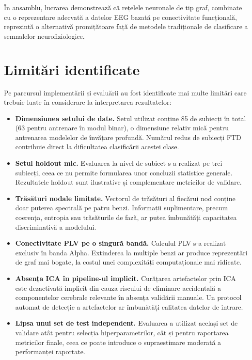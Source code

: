 \documentclass[12pt,a4paper]{report}
\theoremstyle{definition}
\theoremstyle{remark}
\begin{document}
În ansamblu, lucrarea demonstrează că rețelele neuronale de tip graf, combinate
cu o reprezentare adecvată a datelor EEG bazată pe conectivitate funcțională,
reprezintă o alternativă promițătoare față de metodele tradiționale de clasificare
a semnalelor neurofiziologice.

\section{Limitări identificate}

Pe parcursul implementării și evaluării au fost identificate mai multe limitări
care trebuie luate în considerare la interpretarea rezultatelor:

\begin{itemize}
    \item \textbf{Dimensiunea setului de date.} Setul utilizat conține 85 de
    subiecți în total (63 pentru antrenare în modul binar), o dimensiune relativ
    mică pentru antrenarea modelelor de învățare profundă. Numărul redus de
    subiecți FTD contribuie direct la dificultatea clasificării acestei clase.

    \item \textbf{Setul holdout mic.} Evaluarea la nivel de subiect s-a realizat
    pe trei subiecți, ceea ce nu permite formularea unor concluzii statistice
    generale. Rezultatele holdout sunt ilustrative și complementare metricilor
    de validare.

    \item \textbf{Trăsături nodale limitate.} Vectorul de trăsături al fiecărui
    nod conține doar puterea spectrală pe patru benzi. Informații suplimentare,
    precum coerența, entropia sau trăsăturile de fază, ar putea îmbunătăți
    capacitatea discriminativă a modelului.

    \item \textbf{Conectivitate PLV pe o singură bandă.} Calculul PLV s-a
    realizat exclusiv în banda Alpha. Extinderea la multiple benzi ar produce
    reprezentări de graf mai bogate, la costul unei complexități computaționale
    mai ridicate.

    \item \textbf{Absența ICA în pipeline-ul implicit.} Curățarea artefactelor
    prin ICA este dezactivată implicit din cauza riscului de eliminare accidentală
    a componentelor cerebrale relevante în absența validării manuale. Un protocol
    automat de detecție a artefactelor ar îmbunătăți calitatea datelor de intrare.

    \item \textbf{Lipsa unui set de test independent.} Evaluarea a utilizat
    același set de validare atât pentru selecția hiperparametrilor, cât și pentru
    raportarea metricilor finale, ceea ce poate introduce o supraestimare
    moderată a performanței raportate.
\end{itemize}
\end{document}
